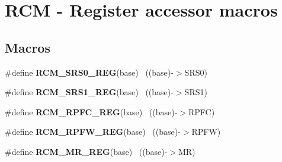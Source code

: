 \hypertarget{group___r_c_m___register___accessor___macros}{}\section{R\+C\+M -\/ Register accessor macros}
\label{group___r_c_m___register___accessor___macros}
\subsection*{Macros}
\begin{DoxyCompactItemize}
\item 
\hypertarget{group___r_c_m___register___accessor___macros_ga9a66988adfb5c993ce955b8ca7ddaa27}{}\#define {\bfseries R\+C\+M\+\_\+\+S\+R\+S0\+\_\+\+R\+E\+G}(base)                                          ~((base)-\/$>$S\+R\+S0)\label{group___r_c_m___register___accessor___macros_ga9a66988adfb5c993ce955b8ca7ddaa27}

\item 
\hypertarget{group___r_c_m___register___accessor___macros_gac6b0aff57a904ff809da2670a9b1992a}{}\#define {\bfseries R\+C\+M\+\_\+\+S\+R\+S1\+\_\+\+R\+E\+G}(base)                                          ~((base)-\/$>$S\+R\+S1)\label{group___r_c_m___register___accessor___macros_gac6b0aff57a904ff809da2670a9b1992a}

\item 
\hypertarget{group___r_c_m___register___accessor___macros_gaa5beb3c127ae8e82881dbd558ddf4ffb}{}\#define {\bfseries R\+C\+M\+\_\+\+R\+P\+F\+C\+\_\+\+R\+E\+G}(base)                                          ~((base)-\/$>$R\+P\+F\+C)\label{group___r_c_m___register___accessor___macros_gaa5beb3c127ae8e82881dbd558ddf4ffb}

\item 
\hypertarget{group___r_c_m___register___accessor___macros_ga5dd502e0c3bac4f307fbb65d51bcf2c7}{}\#define {\bfseries R\+C\+M\+\_\+\+R\+P\+F\+W\+\_\+\+R\+E\+G}(base)                                          ~((base)-\/$>$R\+P\+F\+W)\label{group___r_c_m___register___accessor___macros_ga5dd502e0c3bac4f307fbb65d51bcf2c7}

\item 
\hypertarget{group___r_c_m___register___accessor___macros_ga1d8c54f5dc3a71defe562b00ec97fd40}{}\#define {\bfseries R\+C\+M\+\_\+\+M\+R\+\_\+\+R\+E\+G}(base)                                              ~((base)-\/$>$M\+R)\label{group___r_c_m___register___accessor___macros_ga1d8c54f5dc3a71defe562b00ec97fd40}


\end{DoxyCompactItemize}
